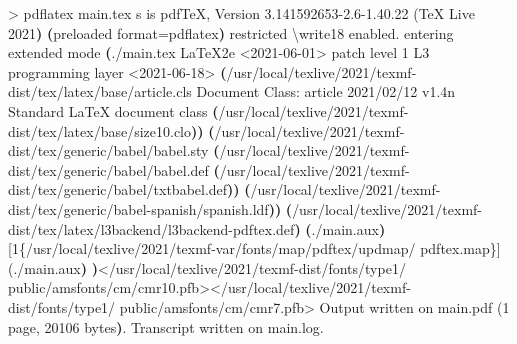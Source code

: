 \documentclass[
  a4paper,
]{scrreport}
\newenvironment{Shaded}{\begin{snugshade}}{\end{snugshade}}
\newcommand{\BuiltInTok}[1]{\textcolor[rgb]{0.00,0.23,0.31}{#1}}
\newcommand{\DataTypeTok}[1]{\textcolor[rgb]{0.68,0.00,0.00}{#1}}
\newcommand{\ErrorTok}[1]{\textcolor[rgb]{0.68,0.00,0.00}{#1}}
\newcommand{\ExtensionTok}[1]{\textcolor[rgb]{0.00,0.23,0.31}{#1}}
\newcommand{\KeywordTok}[1]{\textcolor[rgb]{0.00,0.23,0.31}{\textbf{#1}}}
\newcommand{\NormalTok}[1]{\textcolor[rgb]{0.00,0.23,0.31}{#1}}
\newcommand{\OperatorTok}[1]{\textcolor[rgb]{0.37,0.37,0.37}{#1}}
\newcommand{\VariableTok}[1]{\textcolor[rgb]{0.07,0.07,0.07}{#1}}
\theoremstyle{definition}
\theoremstyle{remark}
\begin{document}
\begin{Shaded}
\begin{Highlighting}[]
\OperatorTok{\textgreater{}}\NormalTok{ pdflatex }\ExtensionTok{main.tex} 
\ExtensionTok{s}\NormalTok{ is pdfTeX, Version 3.141592653{-}2.6{-}1.40.22 }\ErrorTok{(}\ExtensionTok{TeX}\NormalTok{ Live 2021}\KeywordTok{)} \KeywordTok{(}\ExtensionTok{preloaded} 
\VariableTok{format}\OperatorTok{=}\NormalTok{pdflatex}\KeywordTok{)} \ExtensionTok{restricted} \DataTypeTok{\textbackslash{}w}\NormalTok{rite18 enabled.}
\ExtensionTok{entering}\NormalTok{ extended mode}
\KeywordTok{(}\ExtensionTok{./main.tex}
\ExtensionTok{LaTeX2e} \OperatorTok{\textless{}}\NormalTok{2021{-}06{-}01}\OperatorTok{\textgreater{}}\NormalTok{ patch level 1}
\ExtensionTok{L3}\NormalTok{ programming layer }\OperatorTok{\textless{}}\NormalTok{2021{-}06{-}18}\OperatorTok{\textgreater{}}
\KeywordTok{(}\ExtensionTok{/usr/local/texlive/2021/texmf{-}dist/tex/latex/base/article.cls}
\ExtensionTok{Document}\NormalTok{ Class: article 2021/02/12 v1.4n Standard LaTeX document class}
\KeywordTok{(}\ExtensionTok{/usr/local/texlive/2021/texmf{-}dist/tex/latex/base/size10.clo}\KeywordTok{))}
\KeywordTok{(}\ExtensionTok{/usr/local/texlive/2021/texmf{-}dist/tex/generic/babel/babel.sty}
\KeywordTok{(}\ExtensionTok{/usr/local/texlive/2021/texmf{-}dist/tex/generic/babel/babel.def}
\KeywordTok{(}\ExtensionTok{/usr/local/texlive/2021/texmf{-}dist/tex/generic/babel/txtbabel.def}\KeywordTok{))}
\KeywordTok{(}\ExtensionTok{/usr/local/texlive/2021/texmf{-}dist/tex/generic/babel{-}spanish/spanish.ldf}\KeywordTok{))}
\KeywordTok{(}\ExtensionTok{/usr/local/texlive/2021/texmf{-}dist/tex/latex/l3backend/l3backend{-}pdftex.def}\KeywordTok{)}
\KeywordTok{(}\ExtensionTok{./main.aux}\KeywordTok{)} \ExtensionTok{[1\{/usr/local/texlive/2021/texmf{-}var/fonts/map/pdftex/updmap/}
\ExtensionTok{pdftex.map\}]} \ErrorTok{(}\ExtensionTok{./main.aux}\KeywordTok{)} \KeywordTok{)}\OperatorTok{\textless{}}\NormalTok{/usr/local/texlive/2021/texmf{-}dist/fonts/type1/}
\ExtensionTok{public/amsfonts/cm/cmr10.pfb}\OperatorTok{\textgreater{}\textless{}}\NormalTok{/usr/local/texlive/2021/texmf{-}dist/fonts/type1/}
\ExtensionTok{public/amsfonts/cm/cmr7.pfb}\OperatorTok{\textgreater{}}
\ExtensionTok{Output}\NormalTok{ written on main.pdf }\ErrorTok{(}\ExtensionTok{1}\NormalTok{ page, 20106 bytes}\KeywordTok{)}\BuiltInTok{.}
\ExtensionTok{Transcript}\NormalTok{ written on main.log.}
\end{Highlighting}
\end{Shaded}
\end{document}
